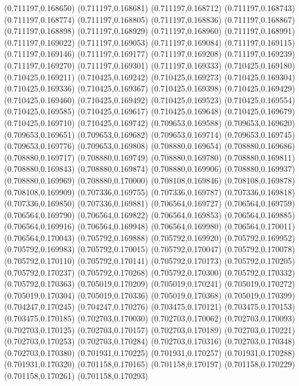 (0.711197,0.168650)
(0.711197,0.168681)
(0.711197,0.168712)
(0.711197,0.168743)
(0.711197,0.168774)
(0.711197,0.168805)
(0.711197,0.168836)
(0.711197,0.168867)
(0.711197,0.168898)
(0.711197,0.168929)
(0.711197,0.168960)
(0.711197,0.168991)
(0.711197,0.169022)
(0.711197,0.169053)
(0.711197,0.169084)
(0.711197,0.169115)
(0.711197,0.169146)
(0.711197,0.169177)
(0.711197,0.169208)
(0.711197,0.169239)
(0.711197,0.169270)
(0.711197,0.169301)
(0.711197,0.169333)
(0.710425,0.169180)
(0.710425,0.169211)
(0.710425,0.169242)
(0.710425,0.169273)
(0.710425,0.169304)
(0.710425,0.169336)
(0.710425,0.169367)
(0.710425,0.169398)
(0.710425,0.169429)
(0.710425,0.169460)
(0.710425,0.169492)
(0.710425,0.169523)
(0.710425,0.169554)
(0.710425,0.169585)
(0.710425,0.169617)
(0.710425,0.169648)
(0.710425,0.169679)
(0.710425,0.169710)
(0.710425,0.169742)
(0.709653,0.169588)
(0.709653,0.169620)
(0.709653,0.169651)
(0.709653,0.169682)
(0.709653,0.169714)
(0.709653,0.169745)
(0.709653,0.169776)
(0.709653,0.169808)
(0.708880,0.169654)
(0.708880,0.169686)
(0.708880,0.169717)
(0.708880,0.169749)
(0.708880,0.169780)
(0.708880,0.169811)
(0.708880,0.169843)
(0.708880,0.169874)
(0.708880,0.169906)
(0.708880,0.169937)
(0.708880,0.169969)
(0.708880,0.170000)
(0.708108,0.169846)
(0.708108,0.169878)
(0.708108,0.169909)
(0.707336,0.169755)
(0.707336,0.169787)
(0.707336,0.169818)
(0.707336,0.169850)
(0.707336,0.169881)
(0.706564,0.169727)
(0.706564,0.169759)
(0.706564,0.169790)
(0.706564,0.169822)
(0.706564,0.169853)
(0.706564,0.169885)
(0.706564,0.169916)
(0.706564,0.169948)
(0.706564,0.169980)
(0.706564,0.170011)
(0.706564,0.170043)
(0.705792,0.169888)
(0.705792,0.169920)
(0.705792,0.169952)
(0.705792,0.169983)
(0.705792,0.170015)
(0.705792,0.170047)
(0.705792,0.170078)
(0.705792,0.170110)
(0.705792,0.170141)
(0.705792,0.170173)
(0.705792,0.170205)
(0.705792,0.170237)
(0.705792,0.170268)
(0.705792,0.170300)
(0.705792,0.170332)
(0.705792,0.170363)
(0.705019,0.170209)
(0.705019,0.170241)
(0.705019,0.170272)
(0.705019,0.170304)
(0.705019,0.170336)
(0.705019,0.170368)
(0.705019,0.170399)
(0.704247,0.170245)
(0.704247,0.170276)
(0.703475,0.170121)
(0.703475,0.170153)
(0.703475,0.170185)
(0.702703,0.170030)
(0.702703,0.170062)
(0.702703,0.170093)
(0.702703,0.170125)
(0.702703,0.170157)
(0.702703,0.170189)
(0.702703,0.170221)
(0.702703,0.170253)
(0.702703,0.170284)
(0.702703,0.170316)
(0.702703,0.170348)
(0.702703,0.170380)
(0.701931,0.170225)
(0.701931,0.170257)
(0.701931,0.170288)
(0.701931,0.170320)
(0.701158,0.170165)
(0.701158,0.170197)
(0.701158,0.170229)
(0.701158,0.170261)
(0.701158,0.170293)
